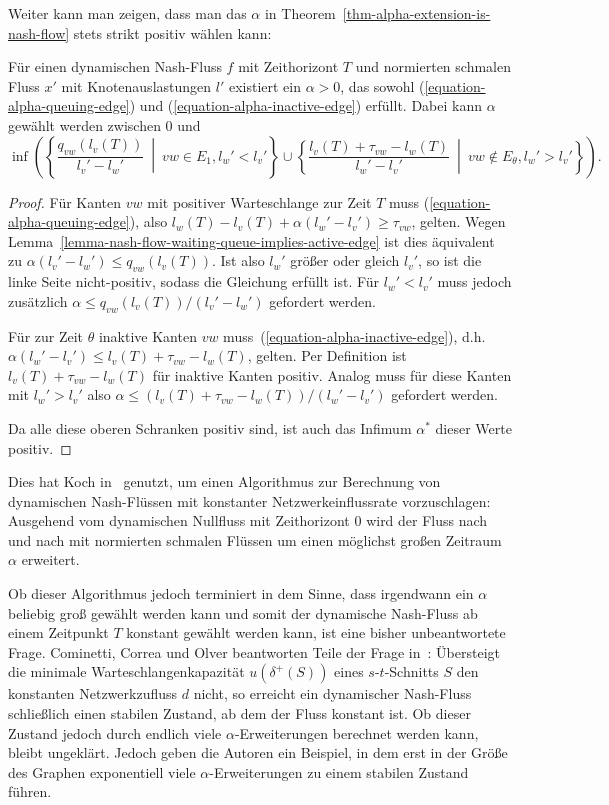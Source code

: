 Weiter kann man zeigen, dass man das $\alpha$ in Theorem~\ref{thm-alpha-extension-is-nash-flow} stets strikt positiv wählen kann:
\begin{proposition}
	Für einen dynamischen Nash-Fluss $f$ mit Zeithorizont $T$ und normierten schmalen Fluss $x'$ mit Knotenauslastungen $l'$ existiert ein $\alpha>0$, das sowohl (\ref{equation-alpha-queuing-edge}) und (\ref{equation-alpha-inactive-edge}) erfüllt.
	Dabei kann $\alpha$ gewählt werden zwischen $0$ und \[
	\inf\left(\left\{ \frac{q_{vw}(l_v(T))}{l_v' - l_w'} ~\middle|~ vw\in E_1, l_w' < l_v' \right\} \cup \left\{ \frac{l_v(T) + \tau_{vw} -l_w(T)}{l_w' - l_v'} ~\middle|~ vw\notin E_\theta, l_w' > l_v' \right\}\right).
	\]
\end{proposition}
\begin{proof}
	Für Kanten $vw$ mit positiver Warteschlange zur Zeit $T$ muss (\ref{equation-alpha-queuing-edge}), also $l_w(T) - l_v(T) + \alpha(l_w' - l_v') \geq \tau_{vw}$, gelten.
	Wegen Lemma~\ref{lemma-nash-flow-waiting-queue-implies-active-edge} ist dies äquivalent zu $\alpha(l_v' - l_w') \leq q_{vw}(l_v(T))$.
	Ist also $l_w'$ größer oder gleich $l_v'$, so ist die linke Seite nicht-positiv, sodass die Gleichung erfüllt ist.
	Für $l_w' < l_v'$ muss jedoch zusätzlich $\alpha\leq q_{vw}(l_v(T)) / (l_v' - l_w')$ gefordert werden.
	
	Für zur Zeit $\theta$ inaktive Kanten $vw$ muss~(\ref{equation-alpha-inactive-edge}), d.h. $\alpha(l_w' -l_v') \leq l_v(T) + \tau_{vw} - l_w(T)$, gelten.
	Per Definition ist $l_v(T) + \tau_{vw} - l_w(T)$ für inaktive Kanten positiv.
	Analog muss für diese Kanten mit $l_w' > l_v'$ also $\alpha \leq (l_v(T) + \tau_{vw} -l_w(T))/(l_w' - l_v')$ gefordert werden.
	
	Da alle diese oberen Schranken positiv sind, ist auch das Infimum $\alpha^*$ dieser Werte positiv.
\end{proof}

Dies hat Koch in~\cite{Koch2011} genutzt, um einen Algorithmus zur Berechnung von dynamischen Nash-Flüssen mit konstanter Netzwerkeinflussrate vorzuschlagen:
Ausgehend vom dynamischen Nullfluss mit Zeithorizont $0$ wird der Fluss nach und nach mit normierten schmalen Flüssen um einen möglichst großen Zeitraum $\alpha$ erweitert.

Ob dieser Algorithmus jedoch terminiert in dem Sinne, dass irgendwann ein $\alpha$ beliebig groß gewählt werden kann und somit der dynamische Nash-Fluss ab einem Zeitpunkt $T$ konstant gewählt werden kann, ist eine bisher unbeantwortete Frage.
Cominetti, Correa und Olver beantworten Teile der Frage in~\cite{CominettiExample}:
Übersteigt die minimale Warteschlangenkapazität $u(\delta^+(S))$ eines $s$-$t$-Schnitts $S$ den konstanten Netzwerkzufluss $d$ nicht, so erreicht ein dynamischer Nash-Fluss schließlich einen stabilen Zustand, ab dem der Fluss konstant ist.
Ob dieser Zustand jedoch durch endlich viele $\alpha$-Erweiterungen berechnet werden kann, bleibt ungeklärt.
Jedoch geben die Autoren ein Beispiel, in dem erst in der Größe des Graphen exponentiell viele $\alpha$-Erweiterungen zu einem stabilen Zustand führen.

